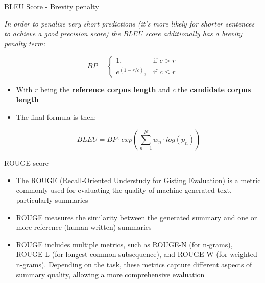 \begin{vbframe}{BLEU Score - Brevity penalty}

\textit{In order to penalize very short predictions (it's more likely for shorter sentences to achieve a good precision score) the BLEU score additionally has a brevity penalty term:}

$$
  BP=\begin{cases}
    1, & \text{if $c>r$}\\
    e^{(1-r/c)}, & \text{if $c\leq r$}
  \end{cases}
$$

\begin{itemize}
    \item With $r$ being the \textbf{reference corpus length} and $c$ the \textbf{candidate corpus length}
    \item The final formula is then:

$$BLEU = BP \cdot exp\left(\sum_{n=1}^{N}w_n\cdot log(p_n)\right)$$
\end{itemize}
    
\end{vbframe}



\begin{vbframe}{ROUGE score}

\vfill

\begin{itemize}
    \item The ROUGE (Recall-Oriented Understudy for Gisting Evaluation) is a metric commonly used for evaluating the quality of machine-generated text, particularly summaries
    \item ROUGE measures the similarity between the generated summary and one or more reference (human-written) summaries
    \item ROUGE includes multiple metrics, such as ROUGE-N (for n-grams), ROUGE-L (for longest common subsequence), and ROUGE-W (for weighted n-grams). Depending on the task, these metrics capture different aspects of summary quality, allowing a more comprehensive evaluation
\end{itemize}

\vfill
    
\end{vbframe}




